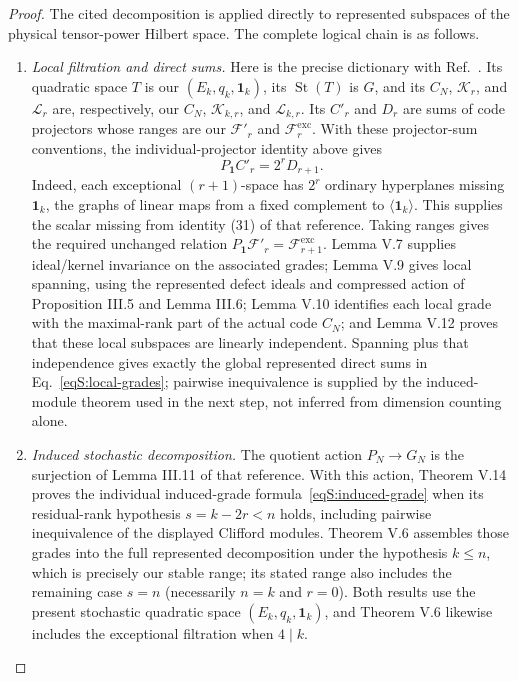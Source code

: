 \documentclass[journal,twocolumn]{IEEEtran}
\theoremstyle{definition}
\theoremstyle{plain}
\newcommand{\Exc}{\mathrm{exc}}
\newcommand{\one}{\bm 1}
\begin{document}
\begin{proof}
The cited decomposition is applied directly to represented subspaces of the
physical tensor-power Hilbert space.  The complete logical chain is as
follows.

\begin{enumerate}
\item \emph{Local filtration and direct sums.}
Here is the precise dictionary with Ref.~\cite{MontealegreGross2025}.  Its
quadratic space $T$ is our $(E_k,q_k,\one_k)$, its
$\operatorname{St}(T)$ is $G$, and its $C_N$, $\mathcal K_r$, and
$\mathcal L_r$ are, respectively, our $C_N$, $\mathcal K_{k,r}$, and
$\mathcal L_{k,r}$.  Its $C'_r$ and $D_r$ are sums of code projectors whose
ranges are our $\mathcal F'_r$ and $\mathcal F_r^{\Exc}$.  With these
projector-sum conventions, the individual-projector identity above gives
\begin{equation}
 P_{\one}C'_r=2^rD_{r+1}.
 \label{eqS:projector-sum-normalization}
\end{equation}
Indeed, each exceptional $(r+1)$-space has $2^r$ ordinary hyperplanes
missing $\one_k$, the graphs of linear maps from a fixed complement to
$\langle\one_k\rangle$.  This supplies the scalar missing from identity
(31) of that reference.  Taking ranges gives the required unchanged relation
$P_{\one}\mathcal F'_r=\mathcal F_{r+1}^{\Exc}$.
Lemma V.7 supplies ideal/kernel invariance on the associated grades;
Lemma V.9 gives local spanning, using the represented defect ideals and
compressed action of Proposition III.5 and Lemma III.6; Lemma V.10 identifies
each local grade with the maximal-rank part of the actual code $C_N$; and
Lemma V.12 proves that these local subspaces are linearly independent.
Spanning plus that independence gives exactly the global represented direct sums
in Eq.~\eqref{eqS:local-grades}; pairwise inequivalence is supplied by the
induced-module theorem used in the next step, not inferred from dimension
counting alone.

\item \emph{Induced stochastic decomposition.}
The quotient action $P_N\to G_N$ is the surjection of Lemma III.11 of that
reference.  With this action, Theorem V.14 proves the individual induced-grade
formula~\eqref{eqS:induced-grade} when its residual-rank hypothesis
$s=k-2r<n$ holds, including pairwise inequivalence of the displayed Clifford
modules.  Theorem V.6 assembles those grades into the full represented
decomposition under the hypothesis $k\leq n$, which is precisely our stable
range; its stated range also includes the remaining case
$s=n$ (necessarily $n=k$ and $r=0$).  Both results use the present stochastic
quadratic space $(E_k,q_k,\one_k)$, and Theorem V.6 likewise includes the
exceptional filtration when $4\mid k$.


\end{enumerate}
\end{proof}
\end{document}
